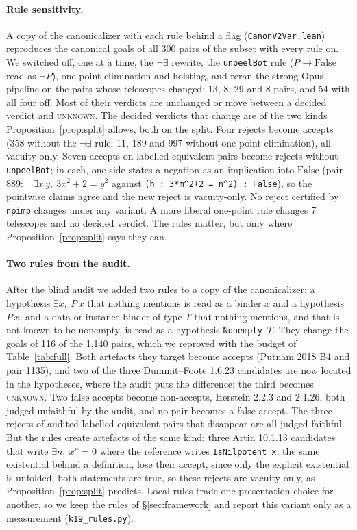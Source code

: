 \documentclass[10pt]{article}
\theoremstyle{definition}
\newcommand{\V}[1]{\textsc{#1}}
\begin{document}
\paragraph{Rule sensitivity.}\label{app:sens} A copy of the canonicalizer with each rule behind
a flag (\texttt{CanonV2Var.lean}) reproduces the canonical goals of all 300 pairs of the subset
with every rule on. We switched off, one at a time, the $\neg\exists$ rewrite, the
\texttt{unpeelBot} rule ($P\to\mathrm{False}$ read as $\neg P$), one-point elimination and
hoisting, and reran the strong Opus pipeline on the pairs whose telescopes changed: 13, 8, 29
and 8 pairs, and 54 with all four off. Most of their verdicts are unchanged or move between a
decided verdict and \V{unknown}. The decided verdicts that change are of the two kinds
Proposition~\ref{prop:split} allows, both on the split. Four rejects become accepts (358 without
the $\neg\exists$ rule; 11, 189 and 997 without one-point elimination), all vacuity-only.
Seven accepts on labelled-equivalent pairs become rejects without \texttt{unpeelBot}; in each,
one side states a negation as an implication into $\mathrm{False}$ (pair 889:
$\neg\exists x\,y,\ 3x^2+2=y^2$ against \texttt{(h : 3*m\^{}2+2 = n\^{}2) : False}), so the
pointwise claims agree and the new reject is vacuity-only. No reject certified by
\texttt{npimp} changes under any variant. A more liberal one-point rule changes 7 telescopes and
no decided verdict. The rules matter, but only where Proposition~\ref{prop:split} says they
can.

\paragraph{Two rules from the audit.}\label{app:k19} After the blind audit we added two rules to
a copy of the canonicalizer: a hypothesis $\exists x,\ P\,x$ that nothing mentions is read as a
binder $x$ and a hypothesis $P\,x$, and a data or instance binder of type $T$ that nothing
mentions, and that is not known to be nonempty, is read as a hypothesis \texttt{Nonempty}~$T$.
They change the goals of 116 of the 1,140 pairs, which we reproved with the budget of
Table~\ref{tab:full}. Both artefacts they target become accepts (Putnam 2018 B4 and pair 1135),
and two of the three Dummit--Foote 1.6.23 candidates are now located in the hypotheses, where
the audit puts the difference; the third becomes \V{unknown}. Two false accepts become
non-accepts, Herstein 2.2.3 and 2.1.26, both judged unfaithful by the audit, and no pair becomes
a false accept. The three rejects of audited labelled-equivalent pairs that disappear are all
judged faithful. But the rules create artefacts of the same kind: three Artin 10.1.13 candidates
that write $\exists n,\ x^n=0$ where the reference writes \texttt{IsNilpotent x}, the same
existential behind a definition, lose their accept, since only the explicit existential is
unfolded; both statements are true, so these rejects are vacuity-only, as
Proposition~\ref{prop:split} predicts. Local rules trade one presentation choice for another, so
we keep the rules of \S\ref{sec:framework} and report this variant only as a measurement
(\texttt{k19\_rules.py}).
\end{document}
